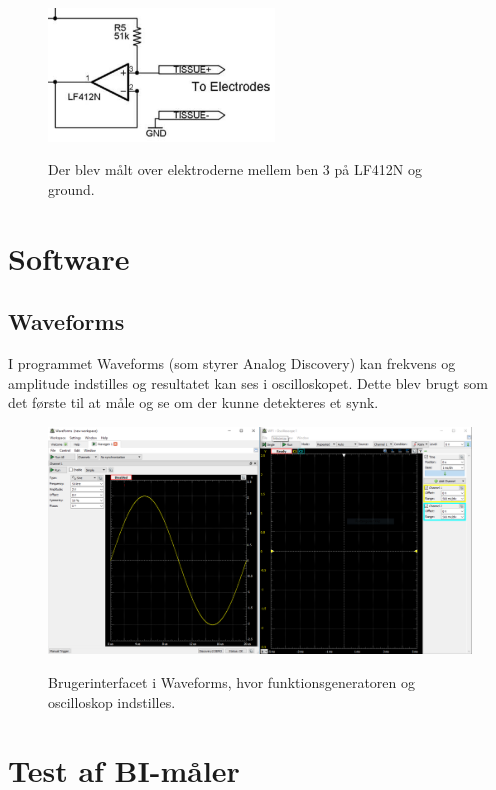 \begin{figure}[H]
\centering
{\includegraphics[width=6cm]
{Figure/elektroderdia}}
\caption{Der blev målt over elektroderne mellem ben 3 på LF412N og ground.}
\label{fig:elektroderdia}
\end{figure}

\section{Software}
\subsection{Waveforms}

I programmet Waveforms (som styrer Analog Discovery) kan frekvens og amplitude indstilles og resultatet kan ses i oscilloskopet. Dette blev brugt som det første til at måle og se om der kunne detekteres et synk.

\begin{figure}[H]
\centering
{\includegraphics[width=14cm]
{Figure/waveforms}}
\caption{Brugerinterfacet i Waveforms, hvor funktionsgeneratoren og oscilloskop indstilles. }
\label{fig:waveforms}
\end{figure}











\section{Test af BI-måler}


